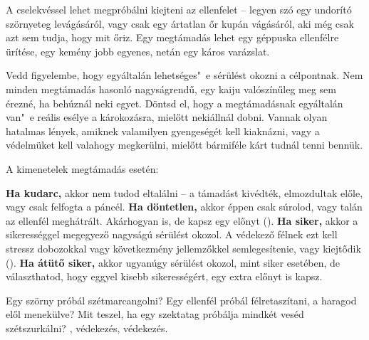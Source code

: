 
A  cselekvéssel lehet megpróbálni kiejteni az ellenfelet -- legyen szó egy undorító szörnyeteg levágásáról, vagy csak egy ártatlan őr kupán vágásáról, aki még csak azt sem tudja, hogy mit őriz. Egy megtámadás lehet egy géppuska ellenfélre ürítése, egy kemény jobb egyenes, netán egy káros varázslat.

Vedd figyelembe, hogy egyáltalán lehetséges"~e sérülést okozni a célpontnak. Nem minden megtámadás hasonló nagyságrendű, egy kaiju valószínűleg meg sem érezné, ha behúznál neki egyet. Döntsd el, hogy a megtámadásnak egyáltalán van"~e reális esélye a károkozásra, mielőtt nekiállnál dobni. Vannak olyan hatalmas lények, amiknek valamilyen gyengeségét kell kiaknázni, vagy a védelmüket kell valahogy megkerülni, mielőtt bármiféle kárt tudnál tenni bennük.

A kimenetelek megtámadás esetén:

\begin{itemize}
    \failureitem \textbf{Ha kudarc,} akkor nem tudod eltalálni -- a támadást kivédték, elmozdultak előle, vagy csak felfogta a páncél.
    \tieitem \textbf{Ha döntetlen,} akkor éppen csak súrolod, vagy talán az ellenfél meghátrált. Akárhogyan is, de kapsz egy előnyt ().
    \successitem \textbf{Ha siker,} akkor a sikerességgel megegyező nagyságú sérülést okozol. A védekező félnek ezt kell stressz dobozokkal vagy következmény jellemzőkkel semlegesítenie, vagy kiejtődik ().
    \successwithstyleitem \textbf{Ha átütő siker,} akkor ugyanúgy sérülést okozol, mint siker esetében, de választhatod, hogy eggyel kisebb sikerességért, egy extra előnyt is kapsz.
\end{itemize}


\newpage

\label{Védekezés}

Egy szörny próbál szétmarcangolni? Egy ellenfél próbál félretaszítani, a haragod elől menekülve? Mit teszel, ha egy szektatag próbálja mindkét veséd szétszurkálni? , védekezés, védekezés.

